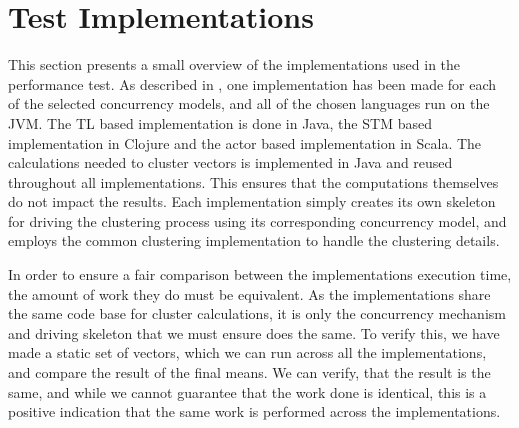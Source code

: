 \section{Test Implementations}
This section presents a small overview of the implementations used in the performance test. As described in , one implementation has been made for each of the selected concurrency models, and all of the chosen languages run on the \ac{JVM}. The \ac{TL} based implementation is done in Java, the \ac{STM} based implementation in Clojure and the actor based implementation in Scala. The calculations needed to cluster vectors is implemented in Java and reused throughout all implementations. This ensures that the computations themselves do not impact the results. Each implementation simply creates its own skeleton for driving the clustering process using its corresponding concurrency model, and employs the common clustering implementation to handle the clustering details. 

In order to ensure a fair comparison between the implementations execution time, the amount of work they do must be equivalent. As the implementations share the same code base for cluster calculations, it is only the concurrency mechanism and driving skeleton that we must ensure does the same. To verify this, we have made a static set of vectors, which we can run across all the implementations, and compare the result of the final means. We can verify, that the result is the same, and while we cannot guarantee that the work done is identical, this is a positive indication that the same work is performed across the implementations.

